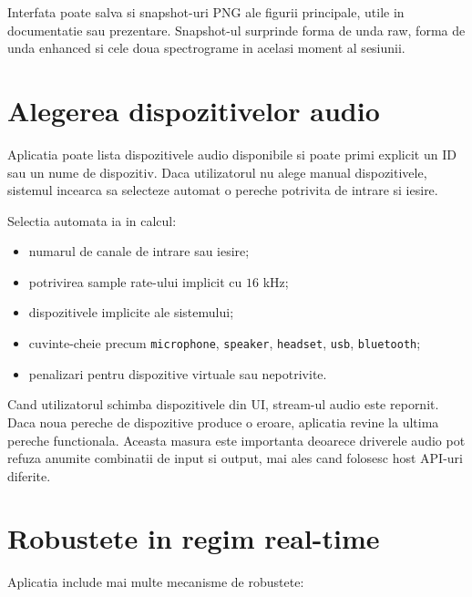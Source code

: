 Interfata poate salva si snapshot-uri PNG ale figurii principale, utile in
documentatie sau prezentare. Snapshot-ul surprinde forma de unda raw, forma de
unda enhanced si cele doua spectrograme in acelasi moment al sesiunii.

\section{Alegerea dispozitivelor audio}

Aplicatia poate lista dispozitivele audio disponibile si poate primi explicit
un ID sau un nume de dispozitiv. Daca utilizatorul nu alege manual dispozitivele,
sistemul incearca sa selecteze automat o pereche potrivita de intrare si iesire.

Selectia automata ia in calcul:

\begin{itemize}
    \item numarul de canale de intrare sau iesire;
    \item potrivirea sample rate-ului implicit cu \(16\) kHz;
    \item dispozitivele implicite ale sistemului;
    \item cuvinte-cheie precum \texttt{microphone}, \texttt{speaker},
    \texttt{headset}, \texttt{usb}, \texttt{bluetooth};
    \item penalizari pentru dispozitive virtuale sau nepotrivite.
\end{itemize}

Cand utilizatorul schimba dispozitivele din UI, stream-ul audio este repornit.
Daca noua pereche de dispozitive produce o eroare, aplicatia revine la ultima
pereche functionala. Aceasta masura este importanta deoarece driverele audio pot
refuza anumite combinatii de input si output, mai ales cand folosesc host API-uri
diferite.

\section{Robustete in regim real-time}

Aplicatia include mai multe mecanisme de robustete:

